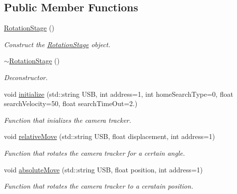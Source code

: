 \subsection*{Public Member Functions}
\begin{DoxyCompactItemize}
\item 
\hyperlink{class_rotation_stage_a14ae00fd0137138b8fa3c653498d13e9}{Rotation\+Stage} ()
\begin{DoxyCompactList}\small\item\em Construct the \hyperlink{class_rotation_stage}{Rotation\+Stage} object. \end{DoxyCompactList}\item 
\hyperlink{class_rotation_stage_a3023bae2d8de9f084036de453d8ac374}{$\sim$\+Rotation\+Stage} ()
\begin{DoxyCompactList}\small\item\em Deconstructor. \end{DoxyCompactList}\item 
void \hyperlink{class_rotation_stage_a47d308cbc52332ea2df332ecea062bae}{initialize} (std\+::string U\+SB, int address=1, int home\+Search\+Type=0, float search\+Velocity=50, float search\+Time\+Out=2.)
\begin{DoxyCompactList}\small\item\em Function that inializes the camera tracker. \end{DoxyCompactList}\item 
void \hyperlink{class_rotation_stage_a6f465da2aaca6b2dc6e808135e3c27e3}{relative\+Move} (std\+::string U\+SB, float displacement, int address=1)
\begin{DoxyCompactList}\small\item\em Function that rotates the camera tracker for a certain angle. \end{DoxyCompactList}\item 
void \hyperlink{class_rotation_stage_a999761588e3c6a2b2c94f9e5d03b42f2}{absolute\+Move} (std\+::string U\+SB, float position, int address=1)
\begin{DoxyCompactList}\small\item\em Function that rotates the camera tracker to a ceratain position. \end{DoxyCompactList}\end{DoxyCompactItemize}
